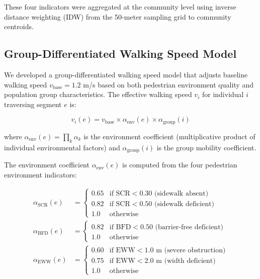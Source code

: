 \documentclass[10pt,conference,compsoc]{IEEEtran}
\begin{document}
These four indicators were aggregated at the community level using inverse distance weighting (IDW) from the 50-meter sampling grid to community centroids.

\subsection{Group-Differentiated Walking Speed Model}

We developed a group-differentiated walking speed model that adjusts baseline walking speed $v_{\text{base}} = 1.2$ m/s based on both pedestrian environment quality and population group characteristics. The effective walking speed $v_i$ for individual $i$ traversing segment $e$ is:

\begin{equation}
v_i(e) = v_{\text{base}} \times \alpha_{\text{env}}(e) \times \alpha_{\text{group}}(i)
\label{eq:velocity_model}
\end{equation}

where $\alpha_{\text{env}}(e) = \prod_{k} \alpha_k$ is the environment coefficient (multiplicative product of individual environmental factors) and $\alpha_{\text{group}}(i)$ is the group mobility coefficient.

The environment coefficient $\alpha_{\text{env}}(e)$ is computed from the four pedestrian environment indicators:

\begin{align}
\alpha_{\text{SCR}}(e) &= 
\begin{cases}
0.65 & \text{if SCR} < 0.30 \text{ (sidewalk absent)} \\
0.82 & \text{if SCR} < 0.50 \text{ (sidewalk deficient)} \\
1.0  & \text{otherwise}
\end{cases} \label{eq:alpha_scr} \\
\alpha_{\text{BFD}}(e) &= 
\begin{cases}
0.82 & \text{if BFD} < 0.50 \text{ (barrier-free deficient)} \\
1.0  & \text{otherwise}
\end{cases} \label{eq:alpha_bfd} \\
\alpha_{\text{EWW}}(e) &= 
\begin{cases}
0.60 & \text{if EWW} < 1.0 \text{ m (severe obstruction)} \\
0.75 & \text{if EWW} < 2.0 \text{ m (width deficient)} \\
1.0  & \text{otherwise}
\end{cases} \label{eq:alpha_eww}
\end{align}
\end{document}
